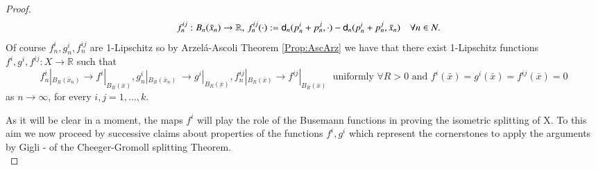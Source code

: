 \documentclass[11pt,reqno]{amsart}
\newcommand{\sfd}{{\sf d}}
\newcommand{\R}{\mathbb{R}}
\theoremstyle{definition}
\theoremstyle{remark}
\theoremstyle{remark}
\theoremstyle{remark}
\theoremstyle{remark}
\theoremstyle{remark}
\theoremstyle{remark}
\theoremstyle{remark}
\begin{document}
\begin{proof}
\begin{equation}
\begin{split}
&\quad \quad f^{ij}_n: B_n(\bar{x}_n)\to \R, \, f^{ij}_n(\cdot):=\sfd_n(p^i_n+p^j_n, \cdot)-\sfd_n(p^i_n+p^j_n, \bar{x}_n)   \quad     \forall n \in N. 
\end{split}
\end{equation}
Of course $f^i_n,g^i_n, f^{ij}_n$ are 1-Lipschitz so by Arzel\'a-Ascoli Theorem \ref{Prop:AscArz} we have that there exist 1-Lipschitz functions $f^i,g^i,f^{ij}:X\to \R$ such that
\begin{equation}\label{fngntofg}
f^i_n|_{B_R(\bar{x}_n)}\to f^i|_{B_R(\bar{x})}, g^i_n|_{B_R(\bar{x}_n)}\ \to g^i|_{B_R(\bar{x})} , f^{ij}_n |_{B_R(\bar{x})}\to f^{ij}|_{B_R(\bar{x})} \; \text{ uniformly } \forall R>0 \text{ and }  f^i(\bar{x})=g^i(\bar{x})=f^{ij}(\bar{x})=0 
\end{equation}
 as $n \to \infty$,  for every  $i,j=1,\ldots,k$. 
 
 As it will be clear in a moment, the maps $f^i$ will play the role of the Busemann functions  in proving the isometric splitting of X. To this aim  we  now proceed by successive claims about properties  of the functions $f^i,g^i$ which represent the  cornerstones to apply the arguments by Gigli \cite{GigliSplitting}-\cite{GigliSplittingSur} of the Cheeger-Gromoll splitting Theorem.
 \\
 

\end{proof}
\end{document}
